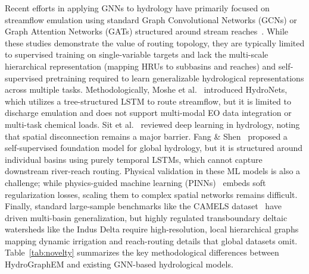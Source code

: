 \documentclass[preprint,12pt]{elsarticle}
\begin{document}
Recent efforts in applying GNNs to hydrology have primarily focused on streamflow emulation using standard Graph Convolutional Networks (GCNs) or Graph Attention Networks (GATs) structured around stream reaches~\citep{yang2020river, moshe2020hydronets}. While these studies demonstrate the value of routing topology, they are typically limited to supervised training on single-variable targets and lack the multi-scale hierarchical representation (mapping HRUs to subbasins and reaches) and self-supervised pretraining required to learn generalizable hydrological representations across multiple tasks. Methodologically, Moshe et al.~\citep{moshe2020hydronets} introduced HydroNets, which utilizes a tree-structured LSTM to route streamflow, but it is limited to discharge emulation and does not support multi-modal EO data integration or multi-task chemical loads. Sit et al.~\citep{sit2021attention} reviewed deep learning in hydrology, noting that spatial disconnection remains a major barrier. Fang \& Shen~\citep{fang2023towards} proposed a self-supervised foundation model for global hydrology, but it is structured around individual basins using purely temporal LSTMs, which cannot capture downstream river-reach routing. Physical validation in these ML models is also a challenge; while physics-guided machine learning (PINNs)~\citep{jia2021physics} embeds soft regularization losses, scaling them to complex spatial networks remains difficult. Finally, standard large-sample benchmarks like the CAMELS dataset~\citep{newman2015camels, addor2017camels} have driven multi-basin generalization, but highly regulated transboundary deltaic watersheds like the Indus Delta require high-resolution, local hierarchical graphs mapping dynamic irrigation and reach-routing details that global datasets omit. Table~\ref{tab:novelty} summarizes the key methodological differences between HydroGraphEM and existing GNN-based hydrological models.
\end{document}
